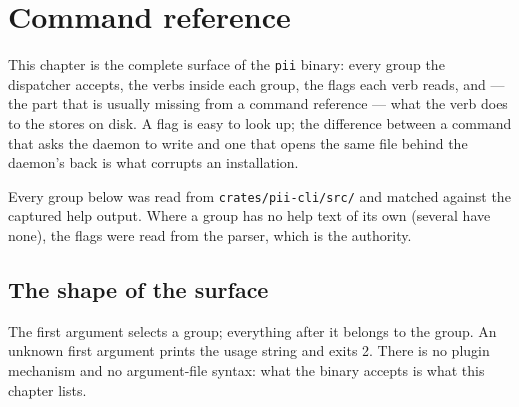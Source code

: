\chapter{Command reference}

\label{ch:commands}

This chapter is the complete surface of the \texttt{pii} binary: every group the dispatcher
accepts, the verbs inside each group, the flags each verb reads, and --- the part that is
usually missing from a command reference --- what the verb does to the stores on disk. A
flag is easy to look up; the difference between a command that asks the daemon to write and
one that opens the same file behind the daemon's back is what corrupts an installation.

Every group below was read from \texttt{crates/pii-cli/src/} and matched against the captured
help output. Where a group has no help text of its own (several have none), the flags were
read from the parser, which is the authority.

\section{The shape of the surface}

The first argument selects a group; everything after it belongs to the group. An unknown
first argument prints the usage string and exits 2. There is no plugin mechanism and no
argument-file syntax: what the binary accepts is what this chapter lists.

\begin{center}
\begin{minipage}{\linewidth}
\centering
{}
\end{minipage}
\end{center}

